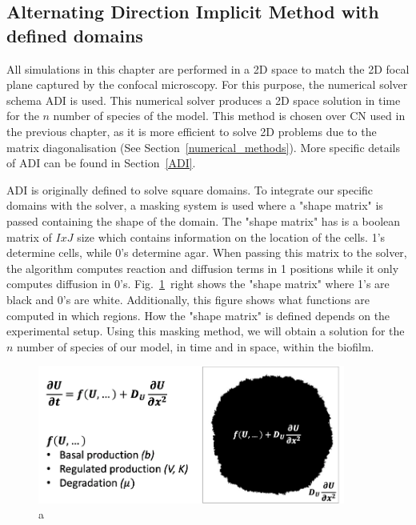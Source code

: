 \subsection{Alternating Direction Implicit Method with defined domains}\label{Alternating Direction Implicit Method with defined domains}
All simulations in this chapter are performed in a \acrshort{2D} space to match the \acrshort{2D} focal plane captured by the confocal microscopy.
For this purpose, the numerical solver schema  \acrfull{ADI} is used.
This numerical solver produces a 2D space solution in time for the $n$ number of species of the model.
This method is chosen over \acrshort{CN} used in the previous chapter, as it is more efficient to solve 2D problems due to the matrix diagonalisation (See Section~\ref{numerical_methods}). More specific details of ADI can be found in Section~\ref{ADI}.



ADI is originally defined to solve square domains.
To integrate our specific domains with the solver, a masking system is used where a "shape matrix" is passed containing the shape of the domain.
The "shape matrix" has is a boolean matrix of $IxJ$ size which contains information on the location of the cells.
1's determine cells, while 0's determine agar.
When passing this matrix to the solver, the algorithm computes reaction and diffusion terms in 1 positions while it only computes diffusion in 0's.
Fig.~\ref{mask}~right shows the "shape matrix" where 1's are black and 0's are white.
Additionally, this figure shows what functions are computed in which regions.
How the "shape matrix" is defined depends on the experimental setup.
Using this masking method, we will obtain a solution for the $n$ number of species of our model, in time and in space, within the biofilm.

\begin{figure}[H]
    \centering

    \includegraphics[width=0.9\textwidth]{chapters/Chapter 3/mask}
    \caption{a}
    \label{mask}
\end{figure}

